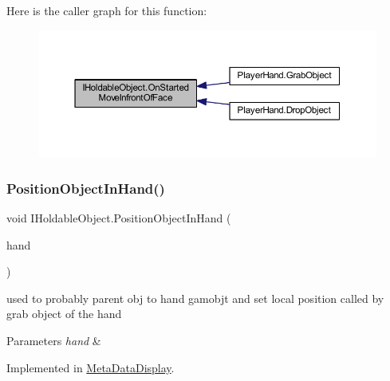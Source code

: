 Here is the caller graph for this function\+:
\nopagebreak
\begin{figure}[H]
\begin{center}
\leavevmode
\includegraphics[width=350pt]{interface_i_holdable_object_af5dcdd5524539104706dadd8a0e15e08_icgraph}
\end{center}
\end{figure}
\mbox{\label{interface_i_holdable_object_a3fe2e7a7d0740225142053583f438333}} 
\subsubsection{\texorpdfstring{Position\+Object\+In\+Hand()}{PositionObjectInHand()}}
{\footnotesize\ttfamily void I\+Holdable\+Object.\+Position\+Object\+In\+Hand (\begin{DoxyParamCaption}\item[{\mbox{\hyperlink{class_player_hand}{Player\+Hand}}}]{hand }\end{DoxyParamCaption})}



used to probably parent obj to hand gamobjt and set local position called by grab object of the hand 


\begin{DoxyParams}{Parameters}
{\em hand} & \\
\hline
\end{DoxyParams}


Implemented in \mbox{\hyperlink{class_meta_data_display_a1ecbc336a25464fc9999120066263e2a}{Meta\+Data\+Display}}.

\mbox{\label{interface_i_holdable_object_aeb32a55273b99d16f9fb5b86f6a73f80}} 
